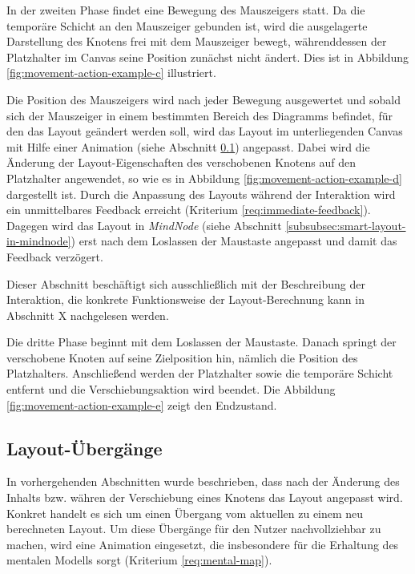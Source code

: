 In der zweiten Phase findet eine Bewegung des Mauszeigers statt. Da die temporäre Schicht an den Mauszeiger gebunden ist, wird die ausgelagerte Darstellung des Knotens frei mit dem Mauszeiger bewegt, währenddessen der Platzhalter im Canvas seine Position zunächst nicht ändert. Dies ist in Abbildung \ref{fig:movement-action-example-c} illustriert.

Die Position des Mauszeigers wird nach jeder Bewegung ausgewertet und sobald sich der Mauszeiger in einem bestimmten Bereich des Diagramms befindet, für den das Layout geändert werden soll, wird das Layout im unterliegenden Canvas mit Hilfe einer Animation (siehe Abschnitt \ref{subsec:layout-transition}) angepasst. Dabei wird die Änderung der Layout-Eigenschaften des verschobenen Knotens auf den Platzhalter angewendet, so wie es in Abbildung \ref{fig:movement-action-example-d} dargestellt ist. Durch die Anpassung des Layouts während der Interaktion wird ein unmittelbares Feedback erreicht (Kriterium \ref{req:immediate-feedback}). Dagegen wird das Layout in \textit{MindNode} (siehe Abschnitt \ref{subsubsec:smart-layout-in-mindnode}) erst nach dem Loslassen der Maustaste angepasst und damit das Feedback verzögert.

Dieser Abschnitt beschäftigt sich ausschließlich mit der Beschreibung der Interaktion, die konkrete Funktionsweise der Layout-Berechnung kann in Abschnitt X nachgelesen werden.

Die dritte Phase beginnt mit dem Loslassen der Maustaste. Danach springt der verschobene Knoten auf seine Zielposition hin, nämlich die Position des Platzhalters. Anschließend werden der Platzhalter sowie die temporäre Schicht entfernt und die Verschiebungsaktion wird beendet. Die Abbildung \ref{fig:movement-action-example-e} zeigt den Endzustand.

\subsection{Layout-Übergänge}
\label{subsec:layout-transition}

In vorhergehenden Abschnitten wurde beschrieben, dass nach der Änderung des Inhalts bzw. währen der Verschiebung eines Knotens das Layout angepasst wird. Konkret handelt es sich um einen Übergang vom aktuellen zu einem neu berechneten Layout. Um diese Übergänge für den Nutzer nachvollziehbar zu machen, wird eine Animation eingesetzt, die insbesondere für die Erhaltung des mentalen Modells sorgt (Kriterium \ref{req:mental-map}).

